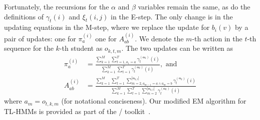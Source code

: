 Fortunately, the recursions for the $\alpha$ and $\beta$ variables remain
the same, as do the definitions of $\gamma_t(i)$ and $\xi_t(i,j)$ in the
E-step. The only change is in the updating equations in the M-step,
where we replace the update for $b_i(v)$ by a pair of updates: one for
$\pi^{(i)}_a$ one for $A^{(i)}_{ab}$. We denote the $m$-th action in the
$t$-th sequence for the $k$-th student as $o_{k,t,m}$. The two updates can
be written as
\begin{align}
  \pi^{(i)}_{a}
  &= \frac{\sum_{k=1}^M \sum_{t=1,a_1 = a}^T \gamma^{(\mathbf{o}_k)}_t(i)}
  {\sum_{k=1}^M \sum_{t=1}^T \gamma^{(\mathbf{o}_k)}_t(i)}, \text{ and }\\
  A^{(i)}_{ab}
  &= \frac{\sum_{k=1}^M \sum_{t=1}^T
  \sum_{m=2,a_{m-1}=a \land a_m = b}^{|\mathbf{o}_{k,t}|}
  \gamma^{(\mathbf{o}_k)}_t(i)}
  {\sum_{k=1}^M \sum_{t=1}^T \sum_{m=2}^{|\mathbf{o}_{k,t}|}
  \gamma^{(\mathbf{o}_k)}_t(i)}
\end{align}
where $a_m = o_{t,k,m}$ (for notational conciseness). Our modified EM
algorithm for TL-HMMs is provided as part of the \meta/
toolkit~\citemeta{}.

